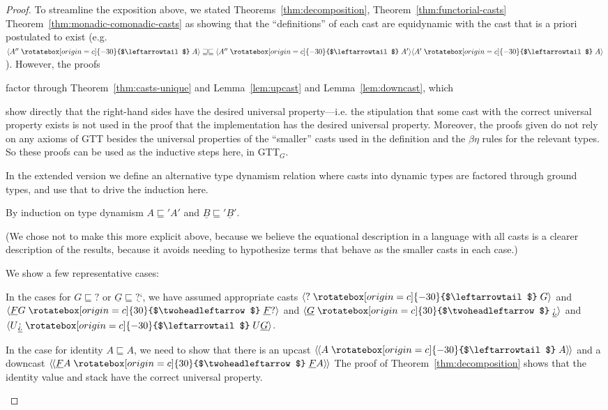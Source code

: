 \documentclass[acmsmall,nonacm]{acmart}
\renewcommand{\u}{\underline}
\newcommand{\ltdyn}{\sqsubseteq}
\newcommand{\gtdyn}{\sqsupseteq}
\newcommand{\equidyn}{\mathrel{\gtdyn\ltdyn}}
\newcommand{\dynv}{{?}}
\newcommand{\dync}{\u {\text{?`}}}
\newcommand{\uarrow}{\mathrel{\rotatebox[origin=c]{-30}{$\leftarrowtail$}}}
\newcommand{\darrow}{\mathrel{\rotatebox[origin=c]{30}{$\twoheadleftarrow$}}}
\newcommand{\upcast}[2]{\langle{#2}\uarrow{#1}\rangle}
\newcommand{\dncast}[2]{\langle{#1}\darrow{#2}\rangle}
\newcommand{\defupcast}[2]{\langle\kern-1ex~\langle{#2}\uarrow{#1}\rangle\kern-1ex~\rangle}
\newcommand{\defdncast}[2]{\langle\kern-1ex~\langle{#1}\darrow{#2}\rangle\kern-1ex~\rangle}
\begin{document}
\begin{proof}
  To streamline the exposition above, we stated
  Theorems~\ref{thm:decomposition}, Theorem~\ref{thm:functorial-casts}
  Theorem~\ref{thm:monadic-comonadic-casts} as showing that the
  ``definitions'' of each cast are equidynamic with the cast that is a
  priori postulated to exist (e.g. $\upcast{A}{A''} \equidyn
  \upcast{A'}{A''}{\upcast{A}{A'}}$).  However, the proofs
  \begin{longonly}
    factor
  through Theorem~\ref{thm:casts-unique} and Lemma~\ref{lem:upcast} and
  Lemma~\ref{lem:downcast}, which
  \end{longonly}
  show directly that the right-hand sides have the desired universal
  property---i.e. the stipulation that some cast with the correct
  universal property exists is not used in the proof that the
  implementation has the desired universal property.  Moreover, the
  proofs given do not rely on any axioms of GTT besides the universal
  properties of the ``smaller'' casts used in the definition and the
  $\beta\eta$ rules for the relevant types.  So these proofs can be used
  as the inductive steps here, in GTT$_G$.
  \begin{shortonly}
  In the extended version we define an alternative type dynamism
  relation where casts into dynamic types are factored through ground
  types, and use that to drive the induction here.  
  \end{shortonly}
  \begin{longonly}
  By induction on type dynamism $A \ltdyn' A'$ and $\u B \ltdyn' \u B'$.

  (We chose not to make this more explicit above, because we believe the
    equational description in a language with all casts is a clearer
    description of the results, because it avoids needing to hypothesize
    terms that behave as the smaller casts in each case.)

  We show a few representative cases:

  In the cases for $G \ltdyn \dynv$ or $\u G \ltdyn \dync$, we have
  assumed appropriate casts $\upcast{G}{\dynv}$ and 
  $\dncast{\u F G}{\u F \dynv}$ and 
  $\dncast{\u G}{\dync}$ and
  $\upcast{U \u G}{U \dync}$.
  
  In the case for identity $A \ltdyn A$, we need to show that there is
  an upcast $\defupcast{A}{A}$ and a downcast $\defdncast{\u F A}{\u F A}$
  The proof of Theorem~\ref{thm:decomposition} shows that the identity
  value and stack have the correct universal property.  


\end{longonly}
\end{proof}
\end{document}
